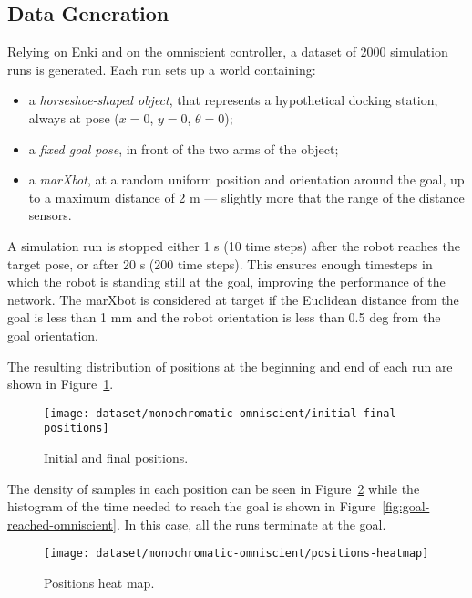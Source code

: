 \subsection{Data Generation}
Relying on Enki and on the omniscient controller, a dataset of 2000 simulation 
runs is generated. 
Each run sets up a world containing:
\begin{itemize}
	\item a \emph{horseshoe-shaped object}, that represents a hypothetical 
	docking 
	station, always at pose ($x=0$, $y=0$, $\theta=0$);
	\item a \emph{fixed goal pose}, in front of the two arms of the object;
	\item a \emph{marXbot}, at a random uniform position and orientation 
	around the 
	goal, up to a maximum distance of 2 m --- slightly more that the range 
	of the distance sensors.
\end{itemize}


A simulation run is stopped either 1 s (10 time steps) after the robot 
reaches the target pose, or after 20 s (200 time steps). This ensures
enough timesteps in which the robot is standing still at the goal, improving
the performance of the network. The marXbot is considered at target if the
Euclidean distance from the goal is less than 1 mm and the robot orientation
is less than 0.5 deg from the goal orientation.

The resulting distribution of positions at the beginning and end of each run
are shown in Figure~\ref{fig:initial-final-positions-omniscient}.

\begin{figure}[htbp]
\centerline{\texttt{[image: dataset/monochromatic-omniscient/initial-final-positions]}}
	\caption{Initial and final positions.}
	\label{fig:initial-final-positions-omniscient}
\end{figure}

The density of samples in each position can be seen in 
Figure~\ref{fig:densisy-omniscient} while the histogram of the time needed to 
reach the goal is shown in Figure~\ref{fig:goal-reached-omniscient}. In this 
case, all the runs terminate at the goal.

\begin{figure}[htbp]
\centerline{\texttt{[image: dataset/monochromatic-omniscient/positions-heatmap]}}
	\caption{Positions heat map.}
	\label{fig:densisy-omniscient}
\end{figure}

